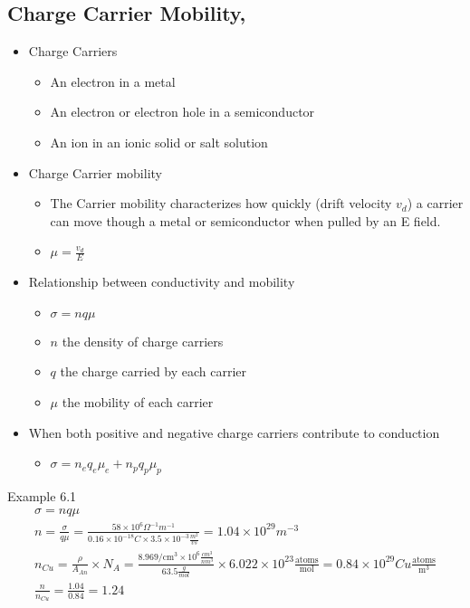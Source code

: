 \documentclass{article}
\begin{document}
\subsection{Charge Carrier Mobility, \mu}
\begin{itemize}
    \item Charge Carriers
    \begin{itemize}
        \item An electron in a metal
        \item An electron or electron hole in a semiconductor
        \item An ion in an ionic solid or salt solution
    \end{itemize}
    \item Charge Carrier mobility
    \begin{itemize}
        \item The Carrier mobility characterizes how quickly (drift velocity $v_d$) a carrier can move though a metal or semiconductor when pulled by an E field.
        \item $\mu = \frac{v_d}{E}$
    \end{itemize}
    \item Relationship between conductivity and mobility
    \begin{itemize}
        \item $\sigma = nq\mu$
        \item $n$ the density of charge carriers
        \item $q$ the charge carried by each carrier
        \item $\mu$ the mobility of each carrier
    \end{itemize}
    \item When both positive and negative charge carriers contribute to conduction
    \begin{itemize}
        \item $\sigma = n_e q_e\mu_e + n_p q_p\mu_p$
    \end{itemize}
\end{itemize}

Example 6.1
\begin{equation}
    \begin{split}
        \sigma = nq\mu \\
        n = \frac{\sigma}{q\mu} = \frac{58 \times 10^{6}\Omega^{-1} m^{-1}}{0.16\times 10^{-18}C \times 3.5 \times 10^{-3}\frac{m^2}{vs}} = 1.04 \times 10^{29} m^{-3} \\
        n_{Cu} = \frac{\rho}{A_{An}}\times N_A = \frac{8.969/\text{cm}^3 \times 10^6 \frac{cm^3}{nm^3}}{63.5 \frac{g}{mol}}\times 6.022 \times 10^{23} \frac{\text{atoms}}{\text{mol}} = 0.84 \times 10^{29} Cu \frac{\text{atoms}}{\text{m}^3} \\
        \frac{n}{n_{Cu}} = \frac{1.04}{0.84} = 1.24
    \end{split}
\end{equation}
\end{document}
